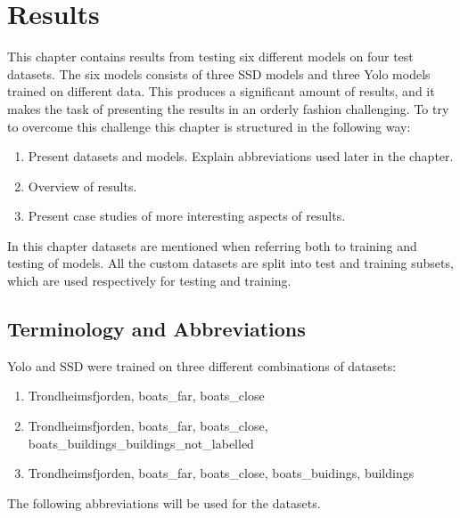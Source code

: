 \chapter{Results}
\label{sec:results}

This chapter contains results from testing six different models on four test datasets. The six models consists of three SSD models and three Yolo models trained on different data. This produces a significant amount of results, and it makes the task of presenting the results in an orderly fashion challenging. To try to overcome this challenge this chapter is structured in the following way:

\begin{enumerate}
    \item Present datasets and models. Explain abbreviations used later in the chapter.
    \item Overview of results.
    \item Present case studies of more interesting aspects of results.
\end{enumerate}

In this chapter datasets are mentioned when referring both to training and testing of models. All the custom datasets are split into test and training subsets, which are used respectively for testing and training.

\section{Terminology and Abbreviations}
Yolo and SSD were trained on three different combinations of datasets:


\begin{enumerate}
    \item Trondheimsfjorden, boats\_far, boats\_close
    \item Trondheimsfjorden, boats\_far, boats\_close, boats\_buildings\_buildings\_not\_labelled
    \item Trondheimsfjorden, boats\_far, boats\_close, boats\_buidings, buildings
\end{enumerate}

\vspace{3mm}

The following abbreviations will be used for the datasets. 

